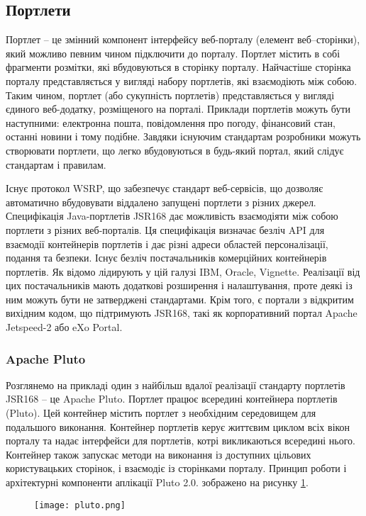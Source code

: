 \subsection{Портлети}
Портлет -- це змінний компонент інтерфейсу веб-порталу (елемент веб--сторінки), який можливо певним чином підключити до порталу.
Портлет містить в собі фрагменти розмітки, які вбудовуються в сторінку порталу. 
Найчастіше сторінка порталу представляється у вигляді набору портлетів, які взаємодіють між собою. 
Таким чином, портлет (або сукупність портлетів) представляється у вигляді єдиного веб-додатку, розміщеного на порталі. 
Приклади портлетів можуть бути наступними: електронна пошта, повідомлення про погоду, фінансовий стан, останні новини і тому подібне.
Завдяки існуючим стандартам розробники можуть створювати портлети, що легко вбудовуються в будь-який портал, який слідує стандартам і правилам.
\par Існує протокол WSRP, що забезпечує стандарт веб-сервісів, що дозволяє автоматично вбудовувати віддалено запущені портлети з різних джерел.
Специфікація Java-портлетів JSR168 дає можливість взаємодіяти між собою портлети з різних веб-порталів. 
Ця специфікація визначає безліч API для взаємодії контейнерів портлетів і дає різні адреси областей персоналізації, подання та безпеки.
Існує безліч постачальників комерційних контейнерів портлетів. 
Як відомо лідирують у цій галузі IBM, Oracle, Vignette. 
Реалізації від цих постачальників мають додаткові розширення і налаштування, проте деякі із ним можуть бути не затверджені стандартами. 
Крім того, є портали з відкритим вихідним кодом, що підтримують JSR168, такі як корпоративний портал Apache Jetspeed-2 або eXo Portal.
\subsubsection{Apache Pluto}
Розглянемо на прикладі один з найбільш вдалої реалізації стандарту портлетів JSR168 -- це Apache Pluto.
Портлет працює всередині контейнера портлетів (Pluto).
Цей контейнер містить портлет з необхідним середовищем для подальшого виконання.
Контейнер портлетів керує життєвим циклом всіх вікон порталу та надає інтерфейси для портлетів, котрі викликаються всередині нього.
Контейнер також запускає методи на виконання із доступних цільових користувацьких сторінок, і взаємодіє із сторінками порталу. Принцип роботи і архітектурні компоненти аплікації Pluto 2.0. зображено на рисунку \ref{pic:pluto}.

    \begin{figure}[!ht]
		\centering
		\texttt{[image: pluto.png]}
		\label{pic:pluto}
	\end{figure}


